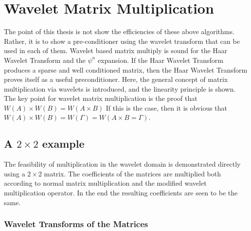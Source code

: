 \section {Wavelet Matrix Multiplication}
The point of this thesis is not show the efficiencies of these above algorithms.  Rather, it is to show a pre-conditioner using the wavelet transform that can be used in each of them.  %
Wavelet based matrix multiply is sound for the Haar Wavelet Transform and the $\psi^n$ expansion.   
If the Haar Wavelet Transform produces a sparse and well conditioned matrix, then the Haar Wavelet Transform proves itself as a useful preconditioner.  %
Here, the general concept of matrix multiplication via wavelets is introduced, and the linearity principle is shown.  
The key point for wavelet matrix multiplication is the proof that $W(A) \times W(B) = W(A\times B)$  If this is the case, then it is obvious that $W(A) \times W(B) = W(\Gamma) = W(A\times B = \Gamma)$.  %



\subsection{A $2\times 2$ example}

The feasibility of multiplication in the wavelet domain is demonstrated directly using a $2 \times 2$ matrix. The coefficients of the matrices are multiplied both according to normal matrix multiplication and the modified wavelet multiplication operator. In the end the resulting coefficients are seen to be the same.

\subsubsection{Wavelet Transforms of the Matrices}

